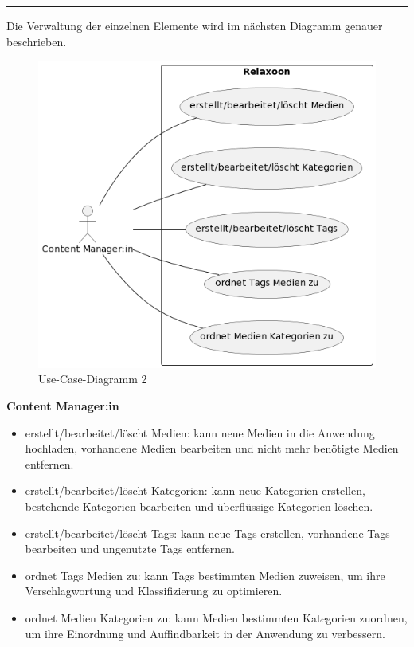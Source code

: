 \rule{\linewidth}{0.3pt}

Die Verwaltung der einzelnen Elemente wird im nächsten Diagramm genauer beschrieben.

\begin{figure}[H]
    \centering
    \includegraphics[height=0.84\textwidth]{./pics/ucd2.png}
    \caption{Use-Case-Diagramm 2}
\end{figure}

\newpage

\textbf{Content Manager:in}
\begin{itemize}
    \item erstellt/bearbeitet/löscht Medien: kann neue Medien in die Anwendung hochladen, vorhandene Medien bearbeiten und nicht mehr benötigte Medien entfernen.
    \item erstellt/bearbeitet/löscht Kategorien: kann neue Kategorien erstellen, bestehende Kategorien bearbeiten und überflüssige Kategorien löschen.
    \item erstellt/bearbeitet/löscht Tags: kann neue Tags erstellen, vorhandene Tags bearbeiten und ungenutzte Tags entfernen.
    \item ordnet Tags Medien zu: kann Tags bestimmten Medien zuweisen, um ihre Verschlagwortung und Klassifizierung zu optimieren.
    \item ordnet Medien Kategorien zu: kann Medien bestimmten Kategorien zuordnen, um ihre Einordnung und Auffindbarkeit in der Anwendung zu verbessern.
\end{itemize}
